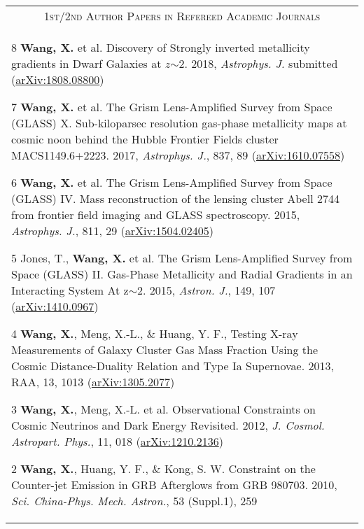 \documentclass[letterpaper,11pt]{article}
\newcommand{\narrow}{-1.8ex}
\begin{document}
\begin{longtable}{p{6.5in}}
\\[\narrow]
\multicolumn{1}{c}{\textsc{1st/2nd Author Papers in Refereed Academic Journals}}      \\
\vspace{-.5em}

\begin{list}{}{\leftmargin=1em}
    \item[8]\hypertarget{18.wang.apj}{} \textbf{Wang, X.} et al. Discovery of Strongly inverted metallicity gradients in Dwarf Galaxies at $z$$\sim$2. 2018, \textit{Astrophys. J.} submitted (\href{https://arxiv.org/abs/1808.08800}{arXiv:1808.08800})
    \item[7]\hypertarget{17.wang.apj}{} \textbf{Wang, X.} et al. The Grism Lens-Amplified Survey from Space (GLASS) X. Sub-kiloparsec resolution gas-phase metallicity maps at cosmic noon behind the Hubble Frontier Fields cluster MACS1149.6+2223. 2017, \textit{Astrophys. J.}, 837, 89 (\href{http://arxiv.org/abs/1610.07558}{arXiv:1610.07558})
    \item[6]\hypertarget{15.wang.apj}{} \textbf{Wang, X.} et al. The Grism Lens-Amplified Survey from Space (GLASS) IV. Mass reconstruction of the lensing cluster Abell 2744 from frontier field imaging and GLASS spectroscopy. 2015, \textit{Astrophys. J.}, 811, 29 (\href{http://arxiv.org/abs/1504.02405}{arXiv:1504.02405})
    \item[5]\hypertarget{15.jones.aj}{} Jones, T., \textbf{Wang, X.} et al. The Grism Lens-Amplified Survey from Space (GLASS) II. Gas-Phase Metallicity and Radial Gradients in an Interacting System At z$\sim$2. 2015, \textit{Astron. J.}, 149, 107 (\href{http://arxiv.org/abs/1410.0967}{arXiv:1410.0967})
    \item[4]\hypertarget{13.wang.raa}{} \textbf{Wang, X.}, Meng, X.-L., \& Huang, Y. F., Testing X-ray Measurements of Galaxy Cluster Gas Mass Fraction Using the Cosmic Distance-Duality Relation and Type Ia Supernovae. 2013, RAA, 13, 1013 (\href{http://arxiv.org/abs/1305.2077}{arXiv:1305.2077})
    \item[3]\hypertarget{12.wang.jcap}{} \textbf{Wang, X.}, Meng, X.-L. et al. Observational Constraints on Cosmic Neutrinos and Dark Energy Revisited. 2012, \textit{J. Cosmol. Astropart. Phys.}, 11, 018 (\href{http://arxiv.org/abs/1210.2136}{arXiv:1210.2136})
    \item[2]\hypertarget{10.wang.scichina}{} \textbf{Wang, X.}, Huang, Y. F., \& Kong, S. W. Constraint on the Counter-jet Emission in GRB Afterglows from GRB 980703. 2010, \textit{Sci. China-Phys. Mech. Astron.}, 53 (Suppl.1), 259
$$
\end{list}
\end{longtable}
\end{document}
